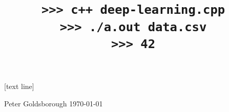 
{
[text line]{%
  \parbox{\linewidth}{%
    \vspace*{-20pt}%
    \footnotesize Peter Goldsborough\hspace{5.2cm} {\today}}%
}

\begin{frame}
  \vspace{1cm}
  \title{
    \begin{flushleft}
      \LARGE\raggedright
      \texttt{>>> c++ deep-learning.cpp} \\
      \vspace{0.5cm}
      \texttt{>>> ./a.out data.csv} \\
      \vspace{0.5cm}
      \texttt{>>> 42}
    \end{flushleft}
    }
  \date{}
  \titlepage
\end{frame}
}

\addtocounter{framenumber}{-1}
